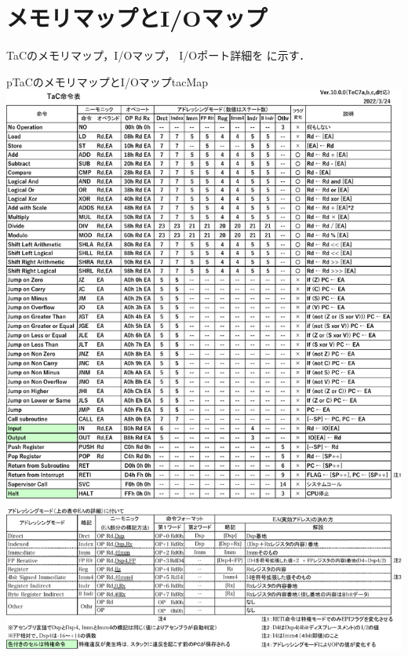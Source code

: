 \section{メモリマップとI/Oマップ}
TaCのメモリマップ，I/Oマップ，
I/Oポート詳細を
に示す．

\begin{myfig}{p}{TaCのメモリマップとI/Oマップ}{tacMap}
  \includegraphics[scale=0.86,page=4]{Fig/TacInst-crop.pdf}
\end{myfig}

